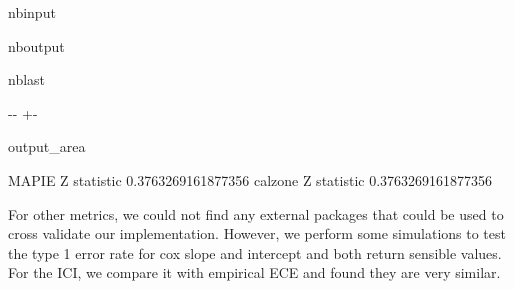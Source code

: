 \documentclass[letterpaper,10pt,english]{sphinxmanual}
\begin{document}
\begin{sphinxuseclass}{nbinput}
{
\begin{sphinxVerbatim}[commandchars=\\\{\}]
\llap{\color{nbsphinxin}[5]:\,\hspace{\fboxrule}\hspace{\fboxsep}}
 \PYG{p}{[}\PYG{p}{]}
 \PYG{p}{[}\PYG{p}{]}
\end{sphinxVerbatim}
}

\end{sphinxuseclass}
\begin{sphinxuseclass}{nboutput}
\begin{sphinxuseclass}{nblast}
{

\kern-\sphinxverbatimsmallskipamount\kern-\baselineskip
\kern+\FrameHeightAdjust\kern-\fboxrule
\vspace{\nbsphinxcodecellspacing}

\begin{sphinxuseclass}{output_area}
\begin{sphinxuseclass}{}


\begin{sphinxVerbatim}[commandchars=\\\{\}]
MAPIE Z statistic 0.3763269161877356
calzone Z statistic 0.3763269161877356
\end{sphinxVerbatim}



\end{sphinxuseclass}
\end{sphinxuseclass}
}

\end{sphinxuseclass}
\end{sphinxuseclass}
\sphinxAtStartPar
For other metrics, we could not find any external packages that could be used to cross validate our implementation. However, we perform some simulations to test the type 1 error rate for cox slope and intercept and both return sensible values. For the ICI, we compare it with empirical ECE and found they are very similar.
\end{document}
